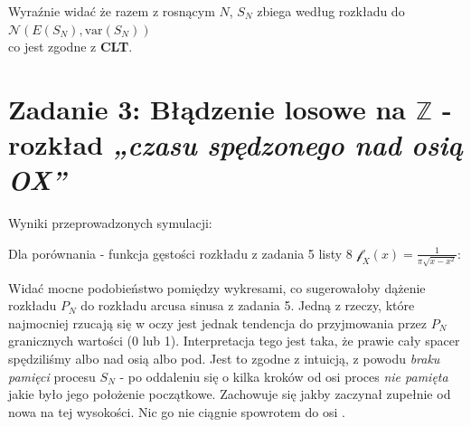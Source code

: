 \documentclass{article}
\begin{document}
Wyraźnie widać że razem z rosnącym \( N \), \( S_N \) zbiega według rozkładu do \( \mathcal{N}\left(E\left(S_N\right), \text{var}\left(S_N\right)\right) \)\\
co jest zgodne z \textbf{CLT}. \\

\section*{Zadanie 3: Błądzenie losowe na \(\mathbb{Z}\) - rozkład \textit{„czasu spędzonego nad osią OX”}}

Wyniki przeprowadzonych symulacji:

Dla porównania - funkcja gęstości rozkładu z zadania 5 listy 8 \( \mathcal{f}_X\left(x\right) = \frac{1}{\pi\sqrt{x - x^2}} \):

Widać mocne podobieństwo pomiędzy wykresami, co sugerowałoby dążenie rozkładu \( P_N \) do rozkładu arcusa sinusa z zadania 5.
Jedną z rzeczy, które najmocniej rzucają się w oczy jest jednak tendencja do przyjmowania przez \( P_N \) granicznych wartości (0 lub 1).
Interpretacja tego jest taka, że prawie cały spacer spędziliśmy albo nad osią  albo pod.
Jest to zgodne z intuicją, z powodu \textit{braku pamięci} procesu \( S_N \) - po oddaleniu się o kilka kroków od osi  
proces \textit{nie pamięta} jakie było jego położenie początkowe. Zachowuje się jakby zaczynał zupełnie od nowa na tej wysokości.
Nic go nie ciągnie spowrotem do osi .
\end{document}
